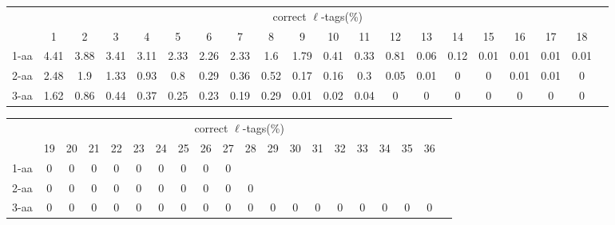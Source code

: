 \documentclass{article}
\begin{document}
\begin{table}[h]\tiny
\vspace{3mm}
{\centering
\begin{center}
\begin{tabular}{|l|c|c|c|c|c|c|c|c|c|c|c|c|c|c|c|c|c|c|c|}
  \hline
  & \multicolumn{ 18 }{|c|}{correct $\ell$-tags(\%)} \\
  \cline{2- 19}
    & 1 & 2 & 3 & 4 & 5 & 6 & 7 & 8 & 9 & 10 & 11 & 12 & 13 & 14 & 15 & 16 & 17 & 18\\
  \hline
1-aa  & 4.41 & 3.88 & 3.41 & 3.11 & 2.33 & 2.26 & 2.33 & 1.6 & 1.79 & 0.41 & 0.33 & 0.81 & 0.06 & 0.12 & 0.01 & 0.01 & 0.01 & 0.01\\
2-aa  & 2.48 & 1.9 & 1.33 & 0.93 & 0.8 & 0.29 & 0.36 & 0.52 & 0.17 & 0.16 & 0.3 & 0.05 & 0.01 & 0 & 0 & 0.01 & 0.01 & 0\\
3-aa  & 1.62 & 0.86 & 0.44 & 0.37 & 0.25 & 0.23 & 0.19 & 0.29 & 0.01 & 0.02 & 0.04 & 0 & 0 & 0 & 0 & 0 & 0 & 0\\
 \hline
\end{tabular}
\end{center}
\par}
\centering

\vspace{3mm}
\label{table:table3}
\end{table}
\begin{table}[h]\tiny
\vspace{3mm}
{\centering
\begin{center}
\begin{tabular}{|l|c|c|c|c|c|c|c|c|c|c|c|c|c|c|c|c|c|c|c|}
  \hline
  & \multicolumn{ 18 }{|c|}{correct $\ell$-tags(\%)} \\
  \cline{2- 19}
    & 19 & 20 & 21 & 22 & 23 & 24 & 25 & 26 & 27 & 28 & 29 & 30 & 31 & 32 & 33 & 34 & 35 & 36\\
  \hline
1-aa  & 0 & 0 & 0 & 0 & 0 & 0 & 0 & 0 & 0 &  &  &  &  &  &  &  &  & \\
2-aa  & 0 & 0 & 0 & 0 & 0 & 0 & 0 & 0 & 0 & 0 &  &  &  &  &  &  &  & \\
3-aa  & 0 & 0 & 0 & 0 & 0 & 0 & 0 & 0 & 0 & 0 & 0 & 0 & 0 & 0 & 0 & 0 & 0 & 0\\
 \hline
\end{tabular}
\end{center}
\par}
\centering

\vspace{3mm}
\label{table:table3}
\end{table}
\end{document}
